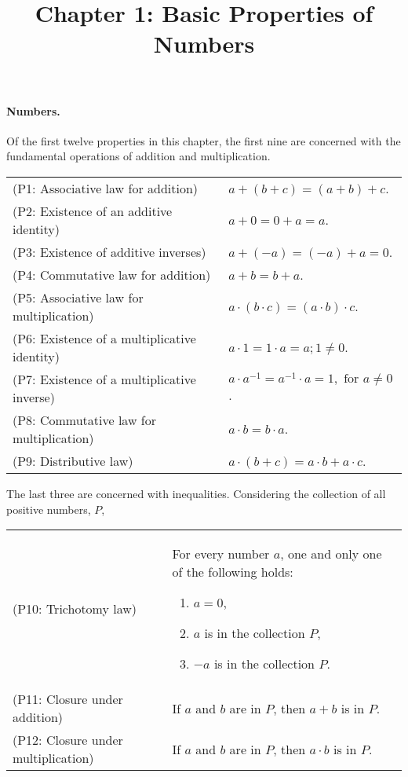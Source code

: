\documentclass{article}
\begin{document}
\title{Chapter 1: Basic Properties of Numbers}
\maketitle

\paragraph{Numbers.} Of the first twelve properties in this chapter, the first
nine are concerned with the fundamental operations of addition and
multiplication.

\begin{tabular}{l p{1.6in}}
  (P1: Associative law for addition) & $a + (b + c) = (a + b) + c$. \\
  (P2: Existence of an additive identity) & $a + 0 = 0 + a = a$. \\
  (P3: Existence of additive inverses) & $a + (-a) = (-a) + a = 0$. \\
  (P4: Commutative law for addition) & $a + b = b + a$. \\
  (P5: Associative law for multiplication) & $a \cdot (b \cdot c) = (a \cdot
    b) \cdot c$. \\
  (P6: Existence of a multiplicative identity) & $a \cdot 1 = 1 \cdot a = a; 1
    \neq 0$. \\
  (P7: Existence of a multiplicative inverse) & $a \cdot a^{-1} = a^{-1} \cdot
    a = 1, \text{ for } a \neq 0$. \\
  (P8: Commutative law for multiplication) & $a \cdot b = b \cdot a$. \\
  (P9: Distributive law) & $a \cdot (b + c) = a \cdot b + a \cdot c$.
\end{tabular}

The last three are concerned with inequalities. Considering the collection of
all positive numbers, $P$,

\begin{tabular}{l p{2in}}
  (P10: Trichotomy law) & For every number $a$, one and only one of the
    following holds:
    \begin{enumerate}
      \itemsep0em
      \item $a = 0$,
      \item $a$ is in the collection $P$,
      \item $-a$ is in the collection $P$.
    \end{enumerate} \\
  (P11: Closure under addition) & If $a$ and $b$ are in $P$, then $a + b$ is
    in $P$. \\
  (P12: Closure under multiplication) & If $a$ and $b$ are in $P$, then $a
    \cdot b$ is in $P$.
\end{tabular}
\end{document}
